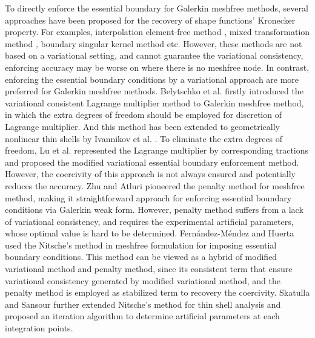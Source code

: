 To directly enforce the essential boundary for Galerkin meshfree methods, several approaches have been proposed for the recovery of shape functions' Kronecker property. For examples, interpolation element-free method \cite{liu2019a}, mixed transformation method \cite{chen2000a}, boundary singular kernel method \cite{chen2000a} etc.
However, these methods are not based on a variational setting, and cannot guarantee the variational consistency, enforcing accuracy may be worse on where there is no meshfree node. In contrast, enforcing the essential boundary conditions by a variational approach are more preferred for Galerkin meshfree methods. 
Belytschko et al.  \cite{belytschko1994, krysl1996} firstly introduced the variational consistent Lagrange multiplier method to Galerkin meshfree method, in which the extra degrees of freedom should be employed for discretion of Lagrange multiplier. And this method has been extended to geometrically nonlinear thin shells by Ivannikov et al. \cite{ivannikov2014a}. 
To eliminate the extra degrees of freedom, Lu et al. \cite{lu1994} represented the Lagrange multiplier by corresponding tractions and proposed the modified variational essential boundary enforcement method. However, the coercivity of this approach is not always ensured and potentially reduces the accuracy. 
Zhu and Atluri \cite{zhu1998} pioneered the penalty method for meshfree method, making it straightforward approach for enforcing essential boundary conditions via Galerkin weak form. However, penalty method suffers from a lack of variational consistency, and requires the experimental artificial parameters, whose optimal value is hard to be determined.
Fernández-Méndez and Huerta \cite{fernandez-mendez2004} used the Nitsche's method in meshfree formulation for imposing essential boundary conditions. This method can be viewed as a hybrid of modified variational method and penalty method, since its consistent term that ensure variational consistency generated by modified variational method, and the penalty method is employed as stabilized term to recovery the coercivity. Skatulla and Sansour \cite{skatulla2008} further extended Nitsche's method for thin shell analysis and proposed an iteration algorithm to determine artificial parameters at each integration points.

